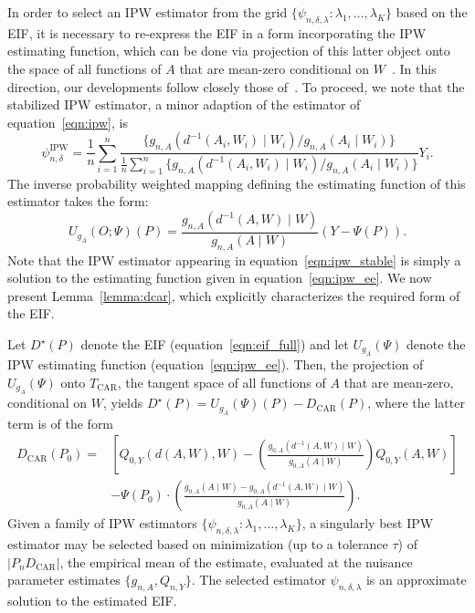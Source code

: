 In order to select an IPW estimator from the grid $\{\psi_{n,\delta,\lambda}:
\lambda_1, \ldots, \lambda_K \}$ based on the EIF, it is necessary to re-express
the EIF in a form incorporating the IPW estimating function, which can be done
via projection of this latter object onto the space of all functions of $A$ that
are mean-zero conditional on $W$~\citep{robins1994estimation,vdl2003unified}.
In this direction, our developments follow closely those
of~\citet{ertefaie2020nonparametric}. To proceed, we note that the stabilized
IPW estimator, a minor adaption of the estimator of equation~\ref{eqn:ipw}, is
\begin{equation}\label{eqn:ipw_stable}
  \psi_{n,\delta}^{\text{IPW}} = \frac{1}{n} \sum_{i=1}^n
  \frac{\{g_{n, A}(d^{-1}(A_i, W_i) \mid W_i) / g_{n, A}(A_i \mid W_i)\}}{
  \frac{1}{n} \sum_{i=1}^n\{g_{n, A}(d^{-1}(A_i, W_i) \mid W_i) /
  g_{n, A}(A_i \mid W_i)\}} Y_i .
\end{equation}
The inverse probability weighted mapping defining the estimating function of
this estimator takes the form:
\begin{equation}\label{eqn:ipw_ee}
  U_{g_A}(O; \Psi)(P) = \frac{g_{n, A}(d^{-1}(A, W) \mid W)}
    {g_{n, A}(A \mid W)}(Y - \Psi(P)).
\end{equation}
Note that the IPW estimator appearing in equation~\ref{eqn:ipw_stable} is simply
a solution to the estimating function given in equation~\ref{eqn:ipw_ee}.
We now present Lemma~\ref{lemma:dcar}, which explicitly characterizes the
required form of the EIF.
\begin{lemma}\label{lemma:dcar}
  Let $D^{\star}(P)$ denote the EIF (equation~\ref{eqn:eif_full}) and let
  $U_{g_A}(\Psi)$ denote the IPW estimating function
  (equation~\ref{eqn:ipw_ee}). Then, the projection of $U_{g_A}(\Psi)$ onto
  $T_{\text{CAR}}$, the tangent space of all functions of $A$ that are
  mean-zero, conditional on $W$, yields $D^{\star}(P) = U_{g_A}(\Psi)(P)
  - D_{\text{CAR}}(P)$, where the latter term is of the form
  \begin{align*}
    D_{\text{CAR}}(P_0) =& \left[Q_{0,Y}(d(A,W),W) -
    \left(\frac{g_{0,A}(d^{-1}(A,W) \mid W)}{g_{0,A}(A \mid W)}\right)
    Q_{0,Y}(A,W)\right]\\ &- \Psi(P_0) \cdot \left(\frac{g_{0,A}(A \mid W) -
    g_{0,A}(d^{-1}(A,W) \mid W)}{g_{0,A}(A \mid W)}\right) .
  \end{align*}
  Given a family of IPW estimators $\{\psi_{n,\delta,\lambda}: \lambda_1,
  \ldots, \lambda_K\}$, a singularly best IPW estimator may be selected based on
  minimization (up to a tolerance $\tau$) of $\lvert P_n D_{\text{CAR}} \rvert$,
  the empirical mean of the estimate, evaluated at the nuisance parameter
  estimates $\{g_{n,A}, Q_{n,Y}\}$. The selected estimator
  $\psi_{n,\delta,\lambda}$ is an approximate solution to the estimated EIF.
\end{lemma}
